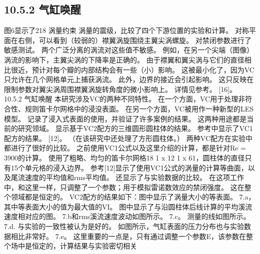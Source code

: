 \documentclass[UTF8,11pt,a4paper,openany,fontset=fandol]{ctexbook}
\begin{document}
\subsection{10.5.2 气缸唤醒}
图6显示了218 涡量约束 涡量的震级，比较了四个下游位置的实验和计算。 对称平面在右侧，可以看到（较弱的）襟翼涡旋围绕主翼尖涡螺旋。 对禁闭参数进行了敏感测试。 两个广泛分离的涡流对这些值不敏感。 例如，在另一个尖端（图像）涡流的影响下，主翼尖涡的下降率是正确的。 由于襟翼和翼尖涡与它们的直径相比很近，预计对每个瓣的内部结构会有一些（小）影响。 这被最小化了，因为VC只允许在几个网格单元上捕获涡流。 此外，边界的接近会引起影响。 这只反映在限制参数对翼尖涡周围襟翼涡旋转角度的微小影响上。 详情见参考。 [16]。 10.5.2 气缸唤醒 本研究涉及VC的两种不同特性。 在一个方面，VC用于处理非符合性、规则笛卡尔网格中的浸没表面。 在另一个方面，VC被用作一种新型的LES模型。 记录了浸入式表面的使用，并验证了许多案例的结果。 这两种用途都是当前的研究领域。 显示基于VC2配方的三维圆形圆柱体的结果。 参考中显示了VC1配方的结果。 [12]。 （在该研究中还处理了方形圆柱体。） 两种VC配方在实验中都进行了很好的比较。 之前使用VC1公式以及这里介绍的计算，都是针对Re = 3900的计算。 使用了粗略、均匀的笛卡尔网格18 1 x 12 1 x 61，圆柱体的直径只有15个单元格的浸入边界。 参考[12]显示了使用VC1公式的涡量的计算等曲面，以及尾流速度的平均值和rms平均值。 还显示了与实验数据的比较。 在这项工作中，和这里一样，只调整了一个参数；用于模拟雷诺数效应的禁闭强度。 这在整个领域都是恒定的。 VC2配方的结果如下：图中显示了涡量大小的等表面。 7.a，其中等表面大小的值为最大值的VI。 图中显示了与沿圆柱体后线计算的平均溪流速度相对应的图。 7.b和rms溪流速度波动如图所示。 7.c。 测量的线如图所示。 7.d. 与实验的一致性被认为是好的。 如图所示，气缸表面的压力分布也与实验数据相比非常好。 7.e。 这里重要的一点是，只有通过调整一个参数E，该参数在整个场中是恒定的，计算结果与实验密切相关
\end{document}
